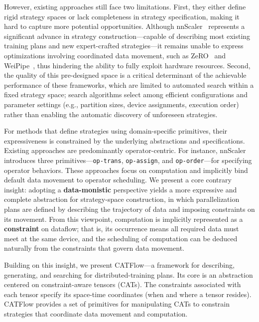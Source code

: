 \documentclass[letterpaper,twocolumn,10pt]{article}
\newcommand{\name}{CATFlow}
\begin{document}
However, existing approaches still face two limitations. First, they either define rigid strategy spaces or lack completeness in strategy specification, making it hard to capture more potential opportunities. Although nnScaler~\cite{lin2024nnscaler} represents a significant advance in strategy construction—capable of describing most existing training plans and new expert-crafted strategies—it remains unable to express optimizations involving coordinated data movement, such as ZeRO~\cite{rajbhandari2020zero} and WeiPipe~\cite{lin2025weipipe}, thus hindering the ability to fully exploit hardware resources. Second, the quality of this pre-designed space is a critical determinant of the achievable performance of these frameworks, which are limited to automated search within a fixed strategy space; search algorithms select among efficient configurations and parameter settings (e.g., partition sizes, device assignments, execution order) rather than enabling the automatic discovery of unforeseen strategies.

For methods that define strategies using domain-specific primitives, their expressiveness is constrained by the underlying abstractions and specifications. Existing approaches are predominantly operator-centric. For instance, nnScaler~\cite{lin2024nnscaler} introduces three primitives—\texttt{op-trans}, \texttt{op-assign}, and \texttt{op-order}—for specifying operator behaviors. These approaches focus on computation and implicitly bind default data movement to operator scheduling. We present a core contrary insight: adopting a \textbf{data-monistic} perspective yields a more expressive and complete abstraction for strategy-space construction, in which parallelization plans are defined by describing the trajectory of data and imposing constraints on its movement. From this viewpoint, computation is implicitly represented as a \textbf{constraint} on dataflow; that is, its occurrence means all required data must meet at the same device, and the scheduling of computation can be deduced naturally from the constraints that govern data movement.

Building on this insight, we present \name{}—a framework for describing, generating, and searching for distributed-training plans. Its core is an abstraction centered on constraint-aware tensors (CATs). The constraints associated with each tensor specify its space-time coordinates (when and where a tensor resides). \name{} provides a set of primitives for manipulating CATs to constrain strategies that coordinate data movement and computation.
\end{document}

